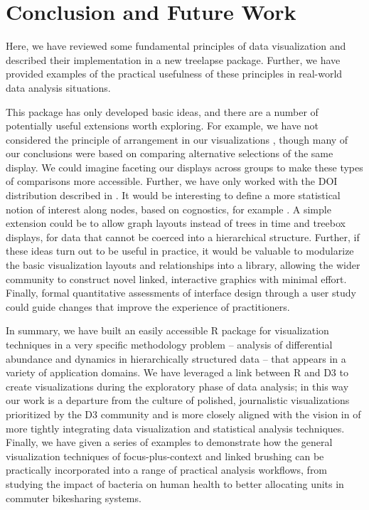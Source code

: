 \section{Conclusion and Future Work}\label{conclusion}

Here, we have reviewed some fundamental principles of data visualization and
described their implementation in a new treelapse package. Further, we have
provided examples of the practical usefulness of these principles in real-world
data analysis situations.

This package has only developed basic ideas, and there are a number of
potentially useful extensions worth exploring. For example, we have not
considered the principle of arrangement in our visualizations
\citep{buja1996interactive}, though many of our conclusions were based on
comparing alternative selections of the same display. We could imagine faceting
our displays across groups to make these types of comparisons more accessible.
Further, we have only worked with the DOI distribution described in
\citep{heer2004doitrees}. It would be interesting to define a more statistical
notion of interest along nodes, based on cognostics, for example
\citep{hafen2013trelliscope, friedman2002john}. A simple extension could be to
allow graph layouts instead of trees in time and treebox displays, for data that
cannot be coerced into a hierarchical structure. Further, if these ideas turn
out to be useful in practice, it would be valuable to modularize the basic
visualization layouts and relationships into a library, allowing the wider
community to construct novel linked, interactive graphics with minimal effort.
Finally, formal quantitative assessments of interface design through a user
study could guide changes that improve the experience of practitioners.

In summary, we have built an easily accessible R package for visualization
techniques in a very specific methodology problem -- analysis of differential
abundance and dynamics in hierarchically structured data -- that appears in a
variety of application domains. We have leveraged a link between R and D3
\citep{vaidyanathan2014htmlwidgets} to create visualizations during the
exploratory phase of data analysis; in this way our work is a departure from the
culture of polished, journalistic visualizations prioritized by the D3 community
and is more closely aligned with the vision in \citep{de2003visual} of more
tightly integrating data visualization and statistical analysis techniques.
Finally, we have given a series of examples to demonstrate how the general
visualization techniques of focus-plus-context and linked brushing can be
practically incorporated into a range of practical analysis workflows, from
studying the impact of bacteria on human health to better allocating units in
commuter bikesharing systems.
